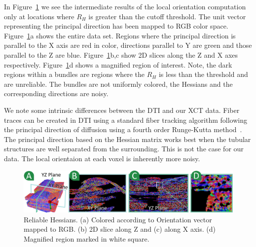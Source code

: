 In Figure~\ref{fig:reliable_hessian} we see the intermediate results of the local orientation computation only at locations where $R_{H}$ is greater than the cutoff threshold. The unit vector representing the principal direction has been mapped to RGB color space. Figure~\ref{fig:reliable_hessian}a shows the entire data set. Regions where the principal direction is parallel to the X axis are red in color, directions parallel to Y are green and those parallel to the Z are blue. Figure~\ref{fig:reliable_hessian}b,c show 2D slices along the Z and X axes respectively. Figure~\ref{fig:reliable_hessian}d shows a magnified region of interest. Note, the dark regions within a bundles are regions where the $R_H$ is less than the threshold and are unreliable. The bundles are not uniformly colored, the Hessians and the corresponding directions are noisy.

 
We note some intrinsic differences between the DTI and our XCT data. Fiber traces can be created in DTI using a standard fiber tracking algorithm following the principal direction of diffusion using a fourth order Runge-Kutta method~\cite{Brun2003}. The principal direction based on the Hessian matrix works best when the tubular structures are well separated from the surrounding. This is not the case for our data. The local orientaion at each voxel is inherently more noisy.

%
\begin{figure}[tb]
\centering
\includegraphics[width=\linewidth]{images_pvis/reliable_hessian.pdf}
 \vspace{-1.5em}
\caption{Reliable Hessians. (a) Colored according to Orientation vector mapped to RGB. (b) 2D slice along Z and (c) along X axis. (d) Magnified region marked in white square.}
\label{fig:reliable_hessian}
\end{figure}


